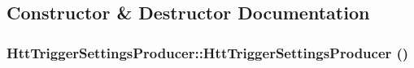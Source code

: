 \subsection{Constructor \& Destructor Documentation}
\hypertarget{classHttTriggerSettingsProducer_a3c34bbb4cfd682c16185052aaec910f3}{
\subsubsection[{HttTriggerSettingsProducer}]{\setlength{\rightskip}{0pt plus 5cm}HttTriggerSettingsProducer::HttTriggerSettingsProducer ()}}
\label{classHttTriggerSettingsProducer_a3c34bbb4cfd682c16185052aaec910f3}


